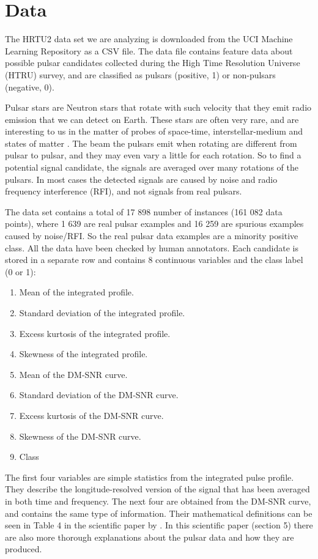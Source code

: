 \documentclass[12pt,a4paper,english]{article}
\begin{document}
\section{Data}
\label{sect:Data}
The HRTU2 data set we are analyzing is downloaded from the UCI Machine Learning Repository \cite{UCI} as a CSV file. The data file contains feature data about possible pulsar candidates collected during the High Time Resolution Universe (HTRU) survey, and are classified as pulsars (positive, 1) or non-pulsars (negative, 0). 

Pulsar stars are Neutron stars that rotate with such velocity that they emit radio emission that we can detect on Earth. These stars are often very rare, and are interesting to us in the matter of probes of space-time, interstellar-medium and states of matter \cite{UCI}. The beam the pulsars emit when rotating are different from pulsar to pulsar, and they may even vary a little for each rotation. So to find a potential signal candidate, the signals are averaged over many rotations of the pulsars. In most cases the detected signals are caused by noise and radio frequency interference (RFI), and not signals from real pulsars.

The data set contains a total of 17 898 number of instances (161 082 data points), where 1 639 are real pulsar examples and 16 259 are spurious examples caused by noise/RFI. So the real pulsar data examples are a minority positive class. All the data have been checked by human annotators. Each candidate is stored in a separate row and contains 8 continuous variables and the class label (0 or 1):
\begin{enumerate}
	\item Mean of the integrated profile.
	\item Standard deviation of the integrated profile.
	\item Excess kurtosis of the integrated profile.
	\item Skewness of the integrated profile.
	\item Mean of the DM-SNR curve.
	\item Standard deviation of the DM-SNR curve.
	\item Excess kurtosis of the DM-SNR curve.
	\item Skewness of the DM-SNR curve.
	\item Class
\end{enumerate}
The first four variables are simple statistics from the integrated pulse profile. They describe the longitude-resolved version of the signal that has been averaged in both time and frequency. The next four are obtained from the DM-SNR curve, and contains the same type of information. Their mathematical definitions can be seen in Table 4 in the scientific paper by \citet{pulsar_art}. In this scientific paper (section 5) there are also more thorough explanations about the pulsar data and how they are produced.
\end{document}
